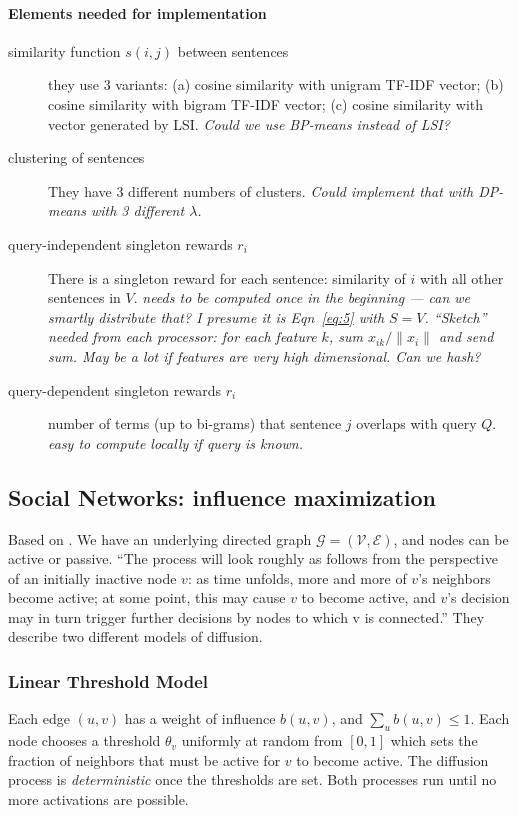 \documentclass{article}
\newcommand{\Gs}{\mathcal{G}}
\newcommand{\Es}{\mathcal{E}}
\newcommand{\Vs}{\mathcal{V}}
\begin{document}
\paragraph{Elements needed for implementation}
\begin{description}
\item[similarity function $s(i,j)$ between sentences] they use 3 variants:
  (a) cosine similarity with unigram TF-IDF vector; (b) cosine similarity with bigram TF-IDF vector; (c) cosine similarity with vector generated by LSI. \emph{Could we use BP-means instead of LSI?}
\item[clustering of sentences] They have 3 different numbers of clusters. \emph{Could implement that with DP-means with 3 different $\lambda$.}
\item[query-independent singleton rewards $r_i$] There is a singleton reward for each sentence: similarity of $i$ with all other sentences in $V$. \emph{needs to be computed once in the beginning --- can we smartly distribute that? I presume it is Eqn~\ref{eq:5} with $S=V$. ``Sketch'' needed from each processor: for each feature $k$, sum $x_{ik}/\|x_i\|$ and send sum. May be a lot if features are very high dimensional. Can we hash?}
\item[query-dependent singleton rewards $r_i$] number of terms (up to bi-grams) that sentence $j$ overlaps with query $Q$. \emph{easy to compute locally if query is known.}
  
\end{description}


\subsection{Social Networks: influence maximization}

Based on \citep{kkt03}. We have an underlying directed graph $\Gs = (\Vs, \Es)$, and nodes can be active or passive. ``The process will look roughly as follows from the perspective of an initially inactive node $v$: as time unfolds, more and more of $v$'s neighbors become active; at some point, this may cause $v$ to become active, and $v$'s decision may in turn trigger further decisions by nodes to which v is connected.''
They describe two different models of diffusion.


\subsubsection{Linear Threshold Model}
Each edge $(u,v)$ has a weight of influence $b(u,v)$, and $\sum_{u} b(u,v) \leq 1$. Each node chooses a threshold $\theta_v$ uniformly at random from $[0,1]$ which sets the fraction of neighbors that must be active for $v$ to become active. The diffusion process is \emph{deterministic} once the thresholds are set. Both processes run until no more activations are possible.
\end{document}
